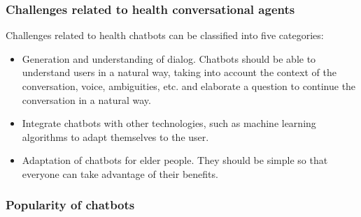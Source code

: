\documentclass[12pt,english]{article}
\begin{document}
\subsubsection{Challenges related to health conversational agents}

Challenges related to health chatbots can be classified into five categories:
\begin{itemize}
  \item Generation and understanding of dialog. Chatbots should be able to understand users in a natural way, taking into account the context of the conversation, voice, ambiguities, etc. and elaborate a question to continue the conversation in a natural way.
  \item Integrate chatbots with other technologies, such as machine learning algorithms to adapt themselves to the user.
  \item Adaptation of chatbots for elder people. They should be simple so that everyone can take advantage of their benefits.
\end{itemize}

\subsubsection{Popularity of chatbots}
\end{document}
